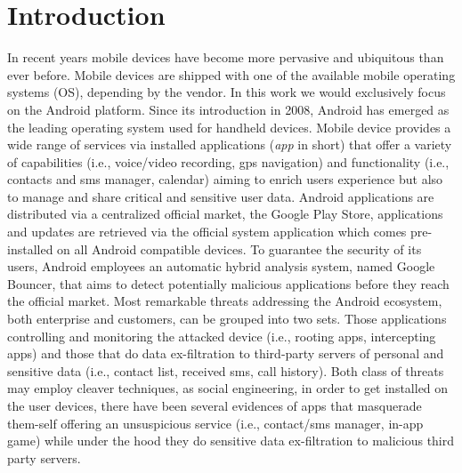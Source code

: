\chapter{Introduction}
\label{introduction}

In recent years mobile devices have become more pervasive and ubiquitous than ever before. Mobile devices are shipped with one of the available mobile operating systems (OS), depending by the vendor. In this work we would exclusively focus on the Android platform. Since its introduction in 2008, Android has emerged as the leading operating system used for handheld devices. Mobile device provides a wide range of services via installed applications (\textit{app} in short) that offer a variety of capabilities (i.e., voice/video recording, gps navigation) and functionality (i.e., contacts and sms manager, calendar) aiming to enrich users experience but also to manage and share critical and sensitive user data.
Android applications are distributed via a centralized official market, the Google Play Store, applications and updates are retrieved via the official system application which comes pre-installed on all Android compatible devices. To guarantee the security of its users, Android employees an automatic hybrid analysis system, named Google Bouncer, that aims to detect potentially malicious applications before they reach the official market. Most remarkable threats addressing the Android ecosystem, both enterprise and customers, can be grouped into two sets. Those applications controlling and monitoring  the attacked device (i.e., rooting apps, intercepting apps) and those that do data ex-filtration to third-party servers of personal and sensitive data (i.e., contact list, received sms, call history). Both class of threats may employ cleaver techniques, as social engineering, in order to get installed on the user devices, there have been several evidences of apps that masquerade them-self offering an unsuspicious service (i.e., contact/sms manager, in-app game) while under the hood they do sensitive data ex-filtration to malicious third party servers.

